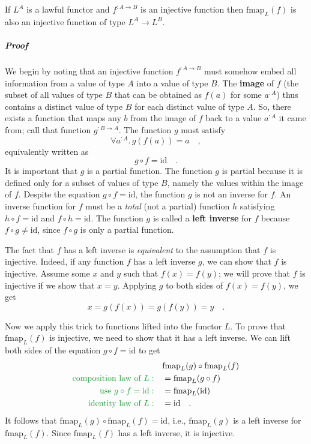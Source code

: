 If $L^{A}$ is a lawful functor and $f^{:A\rightarrow B}$ is an injective
function then $\text{fmap}_{L}(f)$ is also an injective function
of type $L^{A}\rightarrow L^{B}$. 

\subparagraph{Proof}

We begin by noting that an injective function $f^{:A\rightarrow B}$
must somehow embed all information from a value of type $A$ into
a value of type $B$. The \textbf{image} of $f$ (the subset of all
values of type $B$ that can be obtained as $f(a)$ for some $a^{:A}$)
thus contains a distinct value of type $B$ for each distinct value
of type $A$. So, there exists a function that maps any $b$ from
the image of $f$ back to a value $a^{:A}$ it came from; call that
function $g^{:B\rightarrow A}$. The function $g$ must satisfy 
\[
\forall a^{:A}.\,g(f(a))=a\quad,
\]
equivalently written as 
\[
g\circ f=\text{id}\quad.
\]
It is important that $g$ is a partial function.
The function $g$ is partial because it is defined only for a subset
of values of type $B$, namely the values within the image of $f$.
Despite the equation $g\circ f=\text{id}$, the function $g$ is not
an inverse for $f$. An inverse function
for $f$ must be a \emph{total} (not a partial) function $h$ satisfying
$h\circ f=\text{id}$ and $f\circ h=\text{id}$. The function $g$
is called a \textbf{left inverse} for $f$ because
$f\circ g\neq\text{id}$, since $f\circ g$ is only a partial function.

The fact that $f$ has a left inverse is \emph{equivalent} to the
assumption that $f$ is injective. Indeed, if any function $f$ has
a left inverse $g$, we can show that $f$ is injective. Assume some
$x$ and $y$ such that $f(x)=f(y)$; we will prove that $f$ is injective
if we show that $x=y$. Applying $g$ to both sides of $f(x)=f(y)$,
we get
\[
x=g(f(x))=g(f(y))=y\quad.
\]

Now we apply this trick to functions lifted into the functor $L$.
To prove that $\text{fmap}_{L}(f)$ is injective, we need to show
that it has a left inverse. We can lift both sides of the equation
$g\circ f=\text{id}$ to get
\begin{align*}
 & \text{fmap}_{L}(g)\circ\text{fmap}_{L}(f)\\
{\color{greenunder}\text{composition law of }L:}\quad & =\text{fmap}_{L}(g\circ f)\\
{\color{greenunder}\text{use }g\circ f=\text{id}:}\quad & =\text{fmap}_{L}(\text{id})\\
{\color{greenunder}\text{identity law of }L:}\quad & =\text{id}\quad.
\end{align*}
It follows that $\text{fmap}_{L}(g)\circ\text{fmap}_{L}(f)=\text{id}$,
i.e., $\text{fmap}_{L}(g)$ is a left inverse for $\text{fmap}_{L}(f)$.
Since $\text{fmap}_{L}(f)$ has a left inverse, it is injective.

